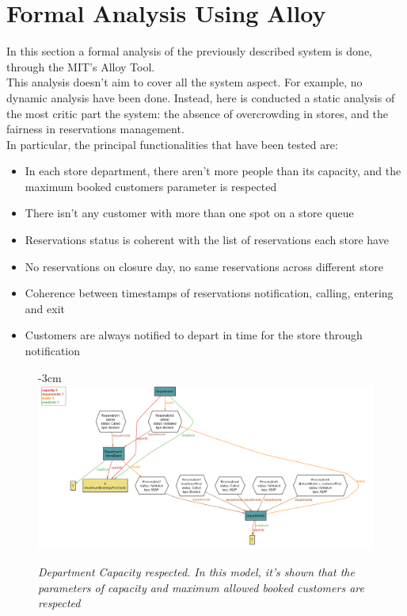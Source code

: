 \documentclass{article}
\begin{document}
\section{Formal Analysis Using Alloy}
	In this section a formal analysis of the previously described system is done, through the MIT's Alloy Tool.\\
	This analysis doesn't aim to cover all the system aspect. For example, no dynamic analysis have been done. Instead, here is conducted a static analysis of the most critic part the system: the absence of overcrowding in stores, and the fairness in reservations management.\\
	In particular, the principal functionalities that have been tested are:
	\begin{itemize}
		\item In each store department, there aren't more people than its capacity, and the maximum booked customers parameter is respected
		\item There isn't any customer with more than one spot on a store queue
		\item Reservations status is coherent with the list of reservations each store have
		\item No reservations on closure day, no same reservations across different store
		\item Coherence between timestamps of reservations notification, calling, entering and exit
		\item Customers are always notified to depart in time for the store through notification
	\end{itemize}
	
	
	\begin{figure}[H]
		\begin{adjustwidth} {-3cm}{}
			\centering			
			\includegraphics[scale=0.5]{AlloyModel/capacityRespected.png}\\
		\end{adjustwidth}
		\caption{\emph{Department Capacity respected. In this model, it's shown that the parameters of capacity and maximum allowed booked customers are respected}}
	\end{figure}
	
\end{document}
